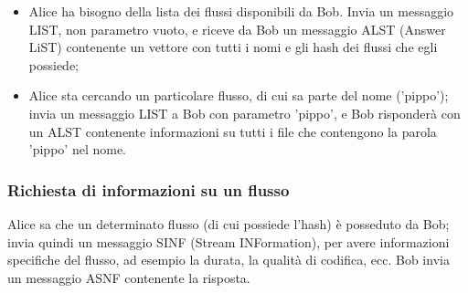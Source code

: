 \begin{itemize}
\item Alice ha bisogno della lista dei flussi disponibili da Bob. Invia un messaggio LIST, non parametro vuoto, e riceve da Bob un messaggio ALST (Answer LiST) contenente un vettore con tutti i nomi e gli hash dei flussi che egli possiede;
\item Alice sta cercando un particolare flusso, di cui sa parte del nome
('pippo'); invia un messaggio LIST a Bob con parametro 'pippo', e Bob
risponderà con un ALST contenente informazioni su tutti i file che contengono la
parola 'pippo' nel nome.
\end{itemize}




\subsubsection{Richiesta di informazioni su un flusso}
%

Alice sa che un determinato flusso (di cui possiede l'hash) è posseduto da Bob;
invia quindi un messaggio SINF (Stream INFormation), per avere informazioni
specifiche del flusso, ad esempio la durata, la qualità di codifica, ecc. Bob
invia un messaggio ASNF contenente la risposta.



